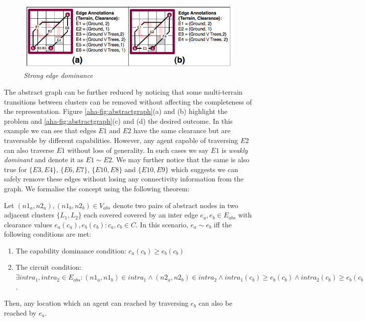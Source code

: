 \begin{figure}[htbp]
        \caption{\emph{Strong edge dominance} }
        \begin{center}
                        \includegraphics[scale=0.3]{diagrams/intraedges_initial.png}
        \end{center}
        \label{aha-fig:strongdominance}
\end{figure}

The abstract graph can be further reduced by noticing that some multi-terrain transitions between clusters can be removed without affecting the completeness of the representation. 
Figure \ref{aha-fig:abstractgraph}(a) and (b) highlight the problem and \ref{aha-fig:abstractgraph}(c) and (d) the desired outcome.
In this example we can see that edges $E1$ and $E2$ have the same clearance but are traversable by different capabilities. 
However, any agent capable of traversing $E2$ can also traverse $E1$ without loss of generality. 
In such cases we say $E1$ is \emph{weakly dominant} and denote it as $E1 \sim E2$. 
We may further notice that the same is also true for $\lbrace E3, E4 \rbrace$, $\lbrace E6, E7 \rbrace$, $\lbrace E10, E8 \rbrace$ and $\lbrace E10, E9 \rbrace$ which suggests we can safely remove these edges without losing any connectivity information from the graph. 
We formalise the concept using the following theorem:
\begin{theorem}
\label{aha-theorem:weakdominance}
Let $(n1_{a}, n2_{a}), (n1_{b}, n2_{b}) \in V_{abs}$ denote two pairs of abstract nodes in two adjacent clusters $\lbrace L_{1}, L_{2} \rbrace$ each covered covered by an inter edge $e_{a}, e_{b} \in E_{abs}$ with clearance values $e_{a}(c_{a}), e_{b}(c_{b})  : c_{a}, c_{b} \in C$.
 In this scenario, $e_{a} \sim e_{b}$ iff the following conditions are met:
\begin{enumerate}
\item{The capability dominance condition: $e_{a}(c_{b}) \geq e_{b}(c_{b})$}
\item{The circuit condition: $\exists intra_{1}, intra_{2} \in E_{abs} : (n1_{a}, n1_{b}) \in intra_{1} \wedge (n2_{a}, n2_{b}) \in intra_{2} \wedge intra_{1}(c_{b}) \geq e_{b}(c_{b}) \wedge intra_{2}(c_{b}) \geq e_{b}(c_{b})$.}
\end{enumerate}
Then, any location which an agent can reached by traversing $e_{b}$ can also be reached by $e_{a}$.
\end{theorem} 

